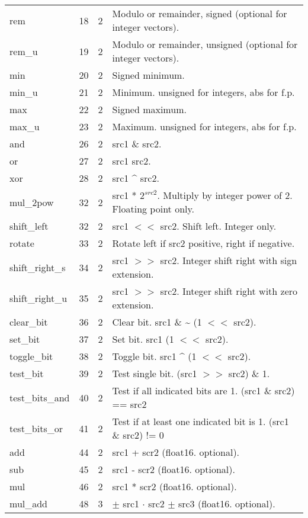 \documentclass[forwardcom.tex]{subfiles}
\begin{document}
\begin{longtable} {|p{25mm}|p{12mm}|p{12mm}|p{100mm}|}
rem          & 18 & 2 & Modulo or remainder, signed (optional for integer vectors). \\
rem\_u       & 19 & 2 & Modulo or remainder, unsigned (optional for integer vectors). \\
min          & 20 & 2 & Signed minimum. \\
min\_u       & 21 & 2 & Minimum. unsigned for integers, abs for f.p. \\
max          & 22 & 2 & Signed maximum. \\
max\_u       & 23 & 2 & Maximum. unsigned for integers, abs for f.p. \\
and          & 26 & 2 & src1 \& src2. \\
or           & 27 & 2 & src1 \textbar{} src2. \\
xor          & 28 & 2 & src1 \^{} src2. \\
mul\_2pow    & 32 & 2 & src1 * $2^{src2}$. Multiply by integer power of 2. Floating point only. \\
shift\_left  & 32 & 2 & src1 $<<$ src2. Shift left. Integer only. \\
rotate       & 33 & 2 & Rotate left if src2 positive, right if negative. \\
shift\_right\_s & 34 & 2 & src1 $>>$ src2. Integer shift right with sign extension.\\
shift\_right\_u & 35 & 2 & src1 $>>$ src2. Integer shift right with zero extension.\\
clear\_bit   & 36 & 2 & Clear bit. src1 \& \~{} (1 $<<$ src2). \\
set\_bit     & 37 & 2 & Set bit. src1 \textbar{} (1 $<<$ src2). \\
toggle\_bit  & 38 & 2 & Toggle bit. src1 \^{} (1 $<<$ src2). \\
test\_bit    & 39 & 2 & Test single bit. (src1 $>>$ src2) \& 1. \\
test\_bits\_and & 40 & 2 & Test if all indicated bits are 1. (src1 \& src2) == src2 \\test\_bits\_or   & 41 & 2 & Test if at least one indicated bit is 1. (src1 \& src2) != 0 \\
add          & 44 & 2 & src1 + scr2 (float16. optional). \\
sub          & 45 & 2 & src1 - scr2 (float16. optional). \\
mul          & 46 & 2 & src1 * scr2 (float16. optional). \\
mul\_add     & 48 & 3 & $\pm$ src1 $\cdot$ src2 $\pm$ src3 (float16. optional). \\

\end{longtable}
\end{document}
